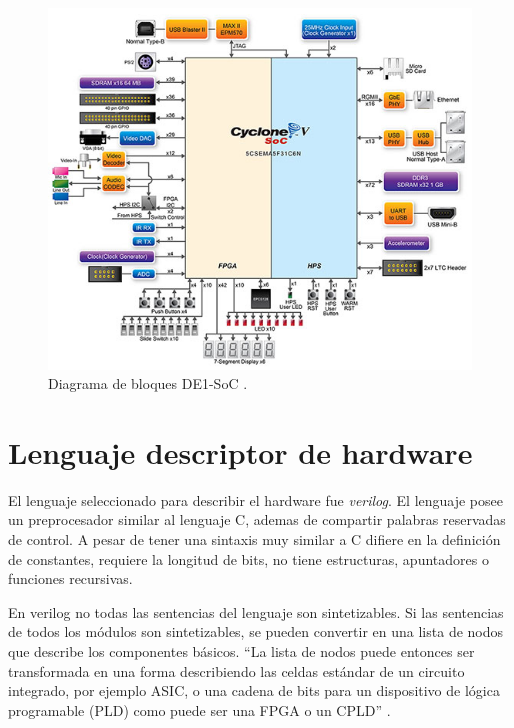 \begin{figure}[htpb]
	\centering
	\includegraphics[scale=0.7]{Figures/fpgablock.jpg}  
	\caption{Diagrama de bloques DE1-SoC \protect\footnotemark.}
	\label{fig:DE1BLOCK}
\end{figure}



\section{Lenguaje descriptor de hardware}


El lenguaje seleccionado para describir el hardware fue \textit{verilog}. El lenguaje posee un preprocesador similar al lenguaje C, ademas de compartir palabras reservadas de control. A pesar de tener una sintaxis muy similar a C difiere en la definición de constantes, requiere la longitud de bits, no tiene estructuras, apuntadores o funciones recursivas. 

En verilog no todas las sentencias del lenguaje son sintetizables. Si las sentencias de todos los módulos son sintetizables, se pueden convertir en una lista de nodos que describe los componentes básicos. ``La lista de nodos puede entonces ser transformada en una forma describiendo las celdas estándar de un circuito integrado, por ejemplo ASIC, o una cadena de bits para un dispositivo de lógica programable (PLD) como puede ser una FPGA o un CPLD'' \citep{WIKIVERILOG}.




